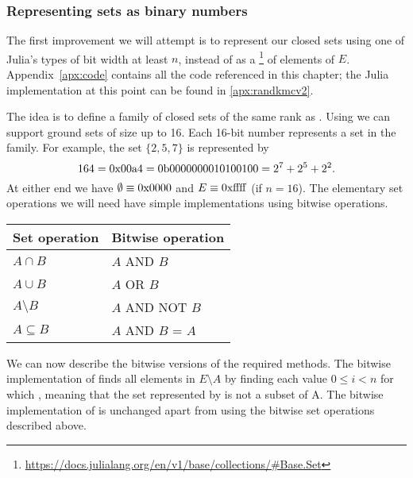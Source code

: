 \subsubsection{Representing sets as binary numbers}
The first improvement we will attempt is to represent our closed sets using one of Julia's  types of bit width at least $n$, instead of as a \footnote{\href{https://docs.julialang.org/en/v1/base/collections/\#Base.Set}{https://docs.julialang.org/en/v1/base/collections/\#Base.Set}} of elements of $E$. Appendix~\ref{apx:code} contains all the code referenced in this chapter; the Julia implementation at this point can be found in \ref{apx:randkmcv2}. 


The idea is to define a family of closed sets of the same rank as . Using  we can support ground sets of size up to 16. Each 16-bit number represents a set in the family. For example, the set $\{ 2,5,7 \}$ is represented by $$164 = 0\rm{x}00\rm{a}4 = 0\rm{b}0000000010100100 = 2^7+2^5+2^2.$$ At either end we have $\emptyset \equiv 0\rm{x}0000$ and $E \equiv 0\rm{xffff}$ (if $n = 16$). The elementary set operations we will need have simple implementations using bitwise operations.

\begin{table}[!ht]
  \centering
  \begin{tabular}{|l|l|}
  \hline
      Set operation & Bitwise operation \\\hline
      $A \cap B$      & $A$ AND $B$ \\\hline
      $A \cup B$      & $A$ OR $B$ \\\hline
      $A \setminus B$ & $A$ AND NOT $B$ \\\hline
      $A \subseteq B$ & $A$ AND $B$ = $A$ \\\hline
  \end{tabular}
\end{table}

We can now describe the bitwise versions of the required methods. The bitwise implementation of  finds all elements in $E \setminus A$ by finding each value $0\leq i< n$ for which , meaning that the set represented by  is not a subset of A. The bitwise implementation of  is unchanged apart from using the bitwise set operations described above.

